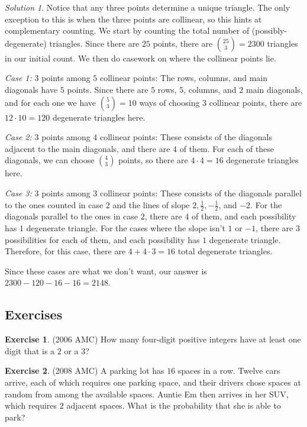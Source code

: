 \documentclass[l1pt]{article}
\theoremstyle{plain}
\theoremstyle{definition}
\newtheorem{exercise}{Exercise}[section]
\theoremstyle{remark}
\newtheorem*{solution}{Solution}
\begin{document}
\begin{solution}
Notice that any three points determine a unique triangle. The only exception to this is when the three points are collinear, so this hints at complementary counting. We start by counting the total number of (possibly-degenerate) triangles. Since there are $25$ points, there are $\binom{25}{3}=2300$ triangles in our initial count. We then do casework on where the collinear points lie.

\textit{Case 1:} $3$ points among $5$ collinear points: The rows, columns, and main diagonals have $5$ points. Since there are $5$ rows, $5$, columns, and $2$ main diagonals, and for each one we have $\binom{5}{3}=10$ ways of choosing $3$ collinear points, there are $12\cdot10=120$ degenerate triangles here.
\newline

\textit{Case 2:} $3$ points among $4$ collinear points: These consists of the diagonals adjacent to the main diagonals, and there are $4$ of them. For each of these diagonals, we can choose $\binom{4}{3}$ points, so there are $4\cdot 4=16$ degenerate triangles here.

\textit{Case 3:} $3$ points among $3$ collinear points: These consists of the diagonals parallel to the ones counted in case $2$ and the lines of slope $2,\frac{1}{2}, -\frac{1}{2}$, and $-2$. For the diagonals parallel to the ones in case $2$, there are $4$ of them, and each possibility has $1$ degenerate triangle. For the cases where the slope isn't $1$ or $-1$, there are $3$ possibilities for each of them, and each possibility has $1$ degenerate triangle. Therefore, for this case, there are $4+4\cdot3=16$ total degenerate triangles.

Since these cases are what we don't want, our answer is $2300-120-16-16=2148$.
\end{solution}

\subsection*{Exercises}
\begin{exercise}
(2006 AMC) How many four-digit positive integers have at least one digit that is a $2$ or a $3$?
\end{exercise}

\begin{exercise}
(2008 AMC) A parking lot has $16$ spaces in a row. Twelve cars arrive, each of which requires one parking space, and their drivers chose spaces at random from among the available spaces. Auntie Em then arrives in her SUV, which requires $2$ adjacent spaces. What is the probability that she is able to park?
\end{exercise}
\end{document}
